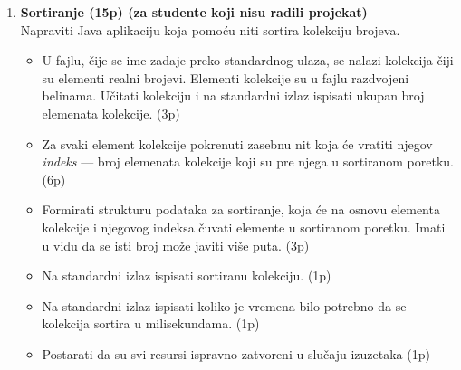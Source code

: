 \documentclass[]{article}
\begin{document}
\begin{enumerate}
\vspace{40pt}

\item \textbf{Sortiranje (15p) (za studente koji nisu radili projekat)}
\\Napraviti Java aplikaciju koja pomoću niti sortira kolekciju brojeva.
\begin{itemize}
  \item U fajlu, čije se ime zadaje preko standardnog ulaza, se nalazi kolekcija \v{c}iji su elementi realni brojevi. Elementi kolekcije su u fajlu razdvojeni belinama. U\v{c}itati kolekciju i na standardni izlaz ispisati ukupan broj elemenata kolekcije. \hfill (3p)
  \item Za svaki element kolekcije pokrenuti zasebnu nit koja će vratiti njegov \textit{indeks} --- broj elemenata kolekcije koji su pre njega u sortiranom poretku. \hfill (6p)
  \item Formirati strukturu podataka za sortiranje, koja će na osnovu elementa kolekcije i njegovog indeksa čuvati elemente u sortiranom poretku. Imati u vidu da se isti broj može javiti više puta. \hfill (3p)
  \item Na standardni izlaz ispisati sortiranu kolekciju. \hfill (1p)
  \item Na standardni izlaz ispisati koliko je vremena bilo potrebno da se kolekcija sortira u milisekundama. \hfill (1p)
  \item Postarati da su svi resursi ispravno zatvoreni u slučaju izuzetaka \hfill (1p)
\end{itemize}

\end{enumerate}
\end{document}
